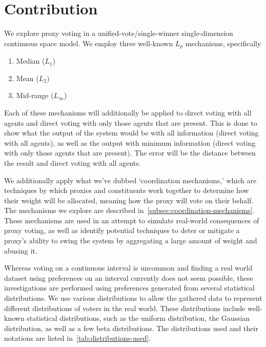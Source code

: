 \section{Contribution}\label{sec:contribution}
We explore proxy voting in a unified-vote/single-winner single-dimension
continuous space model.
We employ three well-known $L_p$ mechanisms, specifically
\begin{enumerate}
    \item {
        Median ($L_1$)
    }
    \item {
        Mean ($L_2$)
    }
    \item {
        Mid-range ($L_\infty$)
    }
\end{enumerate}
Each of these mechanisms will additionally be applied to direct voting with all
agents and direct voting with only those agents that are present.
This is done to show what the output of the system would be with all information
(direct voting with all agents), as well as the output with minimum information
(direct voting with only those agents that are present).
The error will be the distance between the result and direct voting with all agents.

We additionally apply what we've dubbed `coordination mechanisms,' which are
techniques by which proxies and constituents work together to determine how their
weight will be allocated, meaning how the proxy will vote on their behalf.
The mechanisms we explore are described
in~\autoref{subsec:coordination-mechanisms}.
These mechanisms are used in an attempt to simulate real-world consequences of proxy
voting, as well as identify potential techniques to deter or mitigate a proxy's
ability to swing the system by aggregating a large amount of weight and abusing it.  

Whereas voting on a continuous interval is uncommon and finding a real world dataset
using preferences on an interval currently does not seem possible, these investigations
are performed using preferences generated from several statistical distributions.
We use various distributions to allow the gathered data to represent
different distributions of voters in the real world.
These distributions include well-known statistical distributions, such as the uniform
distribution, the Gaussian distribution, as well as a few beta distributions.
The distributions used and their notations are listed
in~\autoref{tab:distributions-used}.

